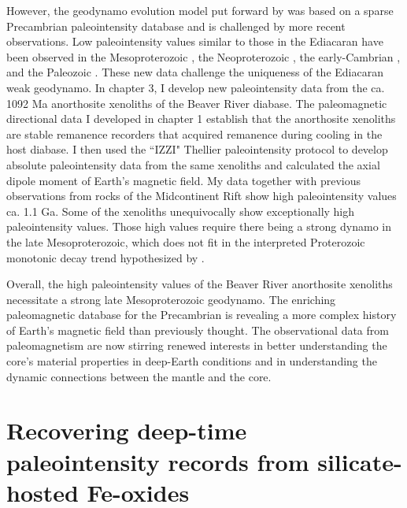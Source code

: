 However, the geodynamo evolution model put forward by \cite{Bono2019a} was based on a sparse Precambrian paleointensity database and is challenged by more recent observations. Low paleointensity values similar to those in the Ediacaran have been observed in the Mesoproterozoic \citep{Lloyd2021b, Shcherbakova2022a, Shcherbakova2023a}, the Neoproterozoic \citep{Lloyd2021a}, the early-Cambrian \citep{Lloyd2022a}, and the Paleozoic \citep{Shcherbakova2021a}. These new data challenge the uniqueness of the Ediacaran weak geodynamo. In chapter 3, I develop new paleointensity data from the ca. 1092 Ma anorthosite xenoliths of the Beaver River diabase. The paleomagnetic directional data I developed in chapter 1 establish that the anorthosite xenoliths are stable remanence recorders that acquired remanence during cooling in the host diabase. I then used the ``IZZI" Thellier paleointensity protocol \citep{Yu2004a} to develop absolute paleointensity data from the same xenoliths and calculated the axial dipole moment of Earth's magnetic field. My data together with previous observations from rocks of the Midcontinent Rift show high paleointensity values ca. 1.1 Ga. Some of the xenoliths unequivocally show exceptionally high paleointensity values. Those high values require there being a strong dynamo in the late Mesoproterozoic, which does not fit in the interpreted Proterozoic monotonic decay trend hypothesized by \cite{Bono2019a}. 

Overall, the high paleointensity values of the Beaver River anorthosite xenoliths necessitate a strong late Mesoproterozoic geodynamo. The enriching paleomagnetic database for the Precambrian is revealing a more complex history of Earth's magnetic field than previously thought. The observational data from paleomagnetism are now stirring renewed interests in better understanding the core's material properties in deep-Earth conditions and in understanding the dynamic connections between the mantle and the core. 

\section{Recovering deep-time paleointensity records from silicate-hosted Fe-oxides}

